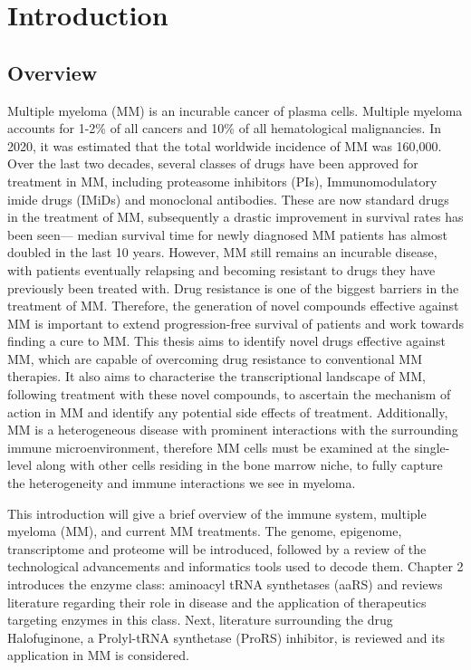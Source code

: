 \chapter{\label{ch:1-intro}Introduction} 




\section{Overview}
Multiple myeloma (MM) is an incurable cancer of plasma cells.
Multiple myeloma accounts for 1-2\% of all cancers and 10\% of all hematological malignancies\cite{international2003criteria}.
In 2020, it was estimated that the total worldwide incidence of MM was 160,000\cite{ludwig2020multiple}.
Over the last two decades, several classes of drugs have been approved for treatment in MM, including proteasome inhibitors (PIs), Immunomodulatory imide drugs (IMiDs) and monoclonal antibodies.
These are now standard drugs in the treatment of MM, subsequently a drastic improvement in survival rates has been seen--- median survival time for newly diagnosed MM patients has almost doubled in the last 10 years\cite{kazandjian2016look}.
However, MM still remains an incurable disease, with patients eventually relapsing and becoming resistant to drugs they have previously been treated with.
Drug resistance is one of the biggest barriers in the treatment of MM.
Therefore, the generation of novel compounds effective against MM is important to extend progression-free survival of patients and work towards finding a cure to MM\@.
This thesis aims to identify novel drugs effective against MM, which are capable of overcoming drug resistance to conventional MM therapies.
It also aims to characterise the transcriptional landscape of MM, following treatment with these novel compounds, to ascertain the mechanism of action in MM and identify any potential side effects of treatment.
Additionally, MM is a heterogeneous disease with prominent interactions with the surrounding immune microenvironment, therefore MM cells must be examined at the single-level along with other cells residing in the bone marrow niche, to fully capture the heterogeneity and immune interactions we see in myeloma.

This introduction will give a brief overview of the immune system, multiple myeloma (MM), and current MM treatments.
The genome, epigenome, transcriptome and proteome will be introduced, followed by a review of the technological advancements and informatics tools used to decode them.
Chapter 2 introduces the enzyme class: aminoacyl tRNA synthetases (aaRS) and reviews literature regarding their role in disease and the application of therapeutics targeting enzymes in this class.
Next, literature surrounding the drug Halofuginone, a Prolyl-tRNA synthetase (ProRS) inhibitor, is reviewed and its application in MM is considered.

